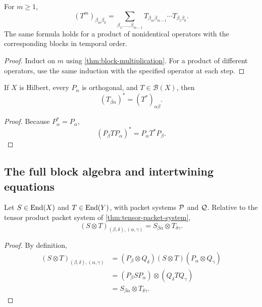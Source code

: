 \begin{corollary}
\label{cor:block-powers}
For $m\geq1$,
\[
(T^m)_{\beta_m\beta_0}
=
\sum_{\beta_1,\ldots,\beta_{m-1}}
T_{\beta_m\beta_{m-1}}
\cdots
T_{\beta_1\beta_0}.
\]
The same formula holds for a product of nonidentical operators with the corresponding blocks in temporal order.
\end{corollary}

\begin{proof}
Induct on $m$ using \cref{thm:block-multiplication}.  For a product of different operators, use the same induction with the specified operator at each step.
\end{proof}

\begin{corollary}
\label{cor:adjoint-reversal}
If $X$ is Hilbert, every $P_\alpha$ is orthogonal, and $T\in\mathcal B(X)$, then
\[
\boxed{(T_{\beta\alpha})^*=(T^*)_{\alpha\beta}.}
\]
\end{corollary}

\begin{proof}
Because $P_\alpha^*=P_\alpha$,
\[
(P_\beta TP_\alpha)^*=P_\alpha T^*P_\beta.
\]
\end{proof}

\subsection{The full block algebra and intertwining equations}

\begin{corollary}
\label{cor:tensor-transfer-blocks}
Let \(S\in\operatorname{End}(X)\) and \(T\in\operatorname{End}(Y)\), with packet systems \(\mathcal P\) and \(\mathcal Q\).  Relative to the tensor product packet system of \cref{thm:tensor-packet-system},
\[
\boxed{
(S\otimes T)_{(\beta,\delta),(\alpha,\gamma)}
=
S_{\beta\alpha}\otimes T_{\delta\gamma}.
}
\]
\end{corollary}

\begin{proof}
By definition,
\begin{align*}
(S\otimes T)_{(\beta,\delta),(\alpha,\gamma)}
&=(P_\beta\otimes Q_\delta)(S\otimes T)(P_\alpha\otimes Q_\gamma)\\
&=(P_\beta SP_\alpha)\otimes(Q_\delta TQ_\gamma)\\
&=S_{\beta\alpha}\otimes T_{\delta\gamma}.
\end{align*}
\end{proof}

